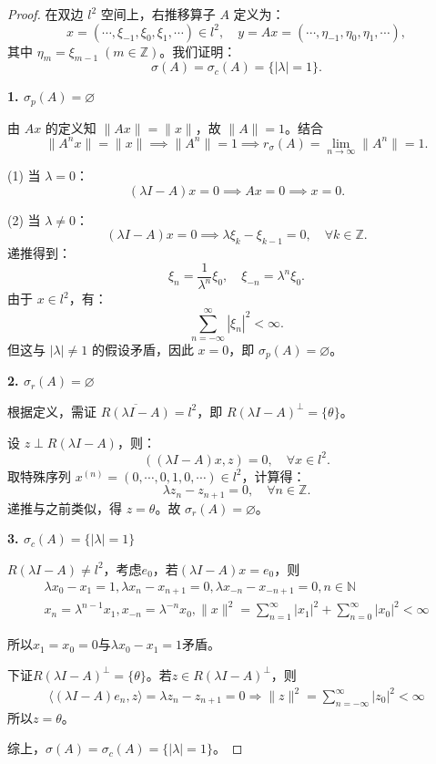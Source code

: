 \documentclass[lang=cn,newtx,10pt,scheme=chinese,thmcnt=chapter]{elegantbook}
\begin{document}
\begin{proof}
在双边 $l^2$ 空间上，右推移算子 $A$ 定义为：
\[
x = (\cdots, \xi_{-1}, \xi_0, \xi_1, \cdots) \in l^2, \quad y = A x = (\cdots, \eta_{-1}, \eta_0, \eta_1, \cdots),
\]
其中 $\eta_m = \xi_{m-1} \; (m \in \mathbb{Z})$。我们证明：
\[
\sigma(A) = \sigma_c(A) = \{|\lambda| = 1\}.
\]

\textbf{1. $\sigma_p(A) = \varnothing$}

由 $A x$ 的定义知 $\|A x\| = \|x\|$，故 $\|A\| = 1$。结合
\[
\|A^n x\| = \|x\| \implies \|A^n\| = 1 \implies r_\sigma(A) = \lim_{n \to \infty} \|A^n\| = 1.
\]

(1) 当 $\lambda = 0$：
\[
(\lambda I - A)x = 0 \implies A x = 0 \implies x = 0.
\]

(2) 当 $\lambda \neq 0$：
\[
(\lambda I - A)x = 0 \implies \lambda \xi_k - \xi_{k-1} = 0, \quad \forall k \in \mathbb{Z}.
\]
递推得到：
\[
\xi_n = \frac{1}{\lambda^n} \xi_0, \quad \xi_{-n} = \lambda^n \xi_0.
\]
由于 $x \in l^2$，有：
\[
\sum_{n=-\infty}^\infty |\xi_n|^2 < \infty.
\]
但这与 $|\lambda| \neq 1$ 的假设矛盾，因此 $x = 0$，即 $\sigma_p(A) = \varnothing$。

\textbf{2. $\sigma_r(A) = \varnothing$}

根据定义，需证 $\overline{R(\lambda I - A)} = l^2$，即 $R(\lambda I - A)^\perp = \{\theta\}$。

设 $z \perp R(\lambda I - A)$，则：
\[
((\lambda I - A)x, z) = 0, \quad \forall x \in l^2.
\]
取特殊序列 $x^{(n)} = (0, \cdots, 0, 1, 0, \cdots) \in l^2$，计算得：
\[
\lambda z_n - z_{n+1} = 0, \quad \forall n \in \mathbb{Z}.
\]
递推与之前类似，得 $z = \theta$。故 $\sigma_r(A) = \varnothing$。

\textbf{3. $\sigma_c(A) = \{|\lambda| = 1\}$}

$R(\lambda I-A)\neq l^2$，考虑$e_0$，若$(\lambda I- A)x=e_0$，则
\begin{equation*}
    \begin{aligned}
        \lambda x_0-x_1=1,\lambda x_n-x_{n+1}=0,\lambda x_{-n}-x_{-n+1}=0,n\in \mathbb{N}
        \\
        x_n=\lambda^{n-1} x_1,x_{-n}={\lambda}^{-n}x_0,\|x\|^2=\sum\limits_{n=1}^\infty|x_1|^2+\sum\limits_{n=0}^\infty|x_0|^2< \infty
    \end{aligned}
\end{equation*}

所以$x_1=x_0=0$与$\lambda x_0-x_1=1$矛盾。

下证$R(\lambda I-A)^\perp =\{\theta\}$。若$z\in R(\lambda I-A)^\perp$，则
\begin{equation*}
    \begin{aligned}
        \langle (\lambda I-A)e_n,z\rangle=\lambda z_n-z_{n+1}=0\Rightarrow \|z\|^2=\sum\limits_{n=-\infty}^\infty |z_0|^2<\infty 
    \end{aligned}
\end{equation*}
所以$z=\theta$。

综上，$\sigma(A) = \sigma_c(A) = \{|\lambda| = 1\}$。
\end{proof}
\end{document}
